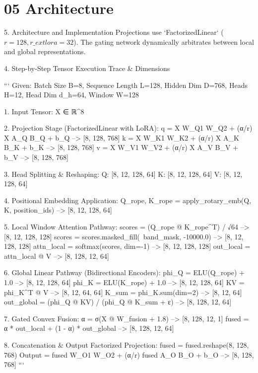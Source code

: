 \section{05 Architecture}

 5. Architecture and Implementation
Projections use `FactorizedLinear` ($r=128, r\_{	ext{lora}}=32$). The gating network dynamically arbitrates between local and global representations.


 4. Step-by-Step Tensor Execution Trace \& Dimensions


```
Given: Batch Size B=8, Sequence Length L=128, Hidden Dim D=768, Heads H=12, Head Dim d\_h=64, Window W=128

1. Input Tensor:
   X ∈ ℝ^{8  }

2. Projection Stage (FactorizedLinear with LoRA):
   q = X W\_Q1 W\_Q2 + (α/r) X A\_Q B\_Q + b\_Q    -->  [8, 128, 768]
   k = X W\_K1 W\_K2 + (α/r) X A\_K B\_K + b\_K    -->  [8, 128, 768]
   v = X W\_V1 W\_V2 + (α/r) X A\_V B\_V + b\_V    -->  [8, 128, 768]

3. Head Splitting \& Reshaping:
   Q: [8, 12, 128, 64]
   K: [8, 12, 128, 64]
   V: [8, 12, 128, 64]

4. Positional Embedding Application:
   Q\_rope, K\_rope = apply\_rotary\_emb(Q, K, position\_ids)  -->  [8, 12, 128, 64]

5. Local Window Attention Pathway:
   scores = (Q\_rope @ K\_rope^T) / √64                      -->  [8, 12, 128, 128]
   scores = scores.masked\_fill(~band\_mask, -10000.0)      -->  [8, 12, 128, 128]
   attn\_local = softmax(scores, dim=-1)                   -->  [8, 12, 128, 128]
   out\_local = attn\_local @ V                             -->  [8, 128, 12, 64]

6. Global Linear Pathway (Bidirectional Encoders):
   phi\_Q = ELU(Q\_rope) + 1.0                              -->  [8, 12, 128, 64]
   phi\_K = ELU(K\_rope) + 1.0                              -->  [8, 12, 128, 64]
   KV = phi\_K^T @ V                                       -->  [8, 12, 64, 64]
   K\_sum = phi\_K.sum(dim=2)                               -->  [8, 12, 64]
   out\_global = (phi\_Q @ KV) / (phi\_Q @ K\_sum + ε)        -->  [8, 128, 12, 64]

7. Gated Convex Fusion:
   α = σ(X @ W\_fusion + 1.8)                              -->  [8, 128, 12, 1]
   fused = α * out\_local + (1 - α) * out\_global           -->  [8, 128, 12, 64]

8. Concatenation \& Output Factorized Projection:
   fused = fused.reshape(8, 128, 768)
   Output = fused W\_O1 W\_O2 + (α/r) fused A\_O B\_O + b\_O   -->  [8, 128, 768]
```

